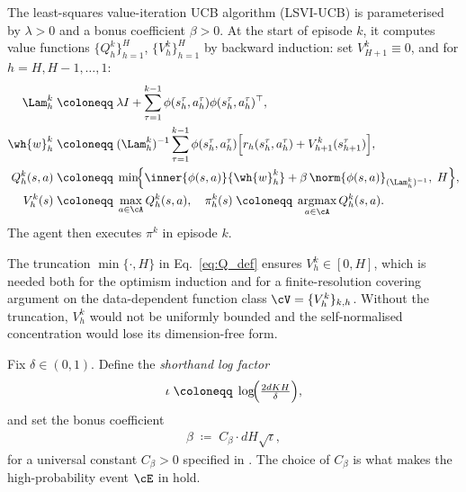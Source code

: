 \begin{definition}\label{def:lsvi_ucb}
The least-squares value-iteration UCB algorithm (LSVI-UCB) is parameterised by $\lambda > 0$ and a bonus coefficient $\beta > 0$. At the start of episode $k$, it computes value functions $\{Q_h^k\}_{h=1}^H$, $\{V_h^k\}_{h=1}^H$ by backward induction: set $V_{H+1}^k \equiv 0$, and for $h = H, H{-}1, \ldots, 1$:
\begin{align}
\Lam_h^k
&\;\coloneqq\; \lambda I + \sum_{\tau=1}^{k-1} \phi(s_h^\tau, a_h^\tau) \phi(s_h^\tau, a_h^\tau)^\top, \label{eq:Lambda_def}\\
\wh{w}_h^k
&\;\coloneqq\; (\Lam_h^k)^{-1} \sum_{\tau=1}^{k-1} \phi(s_h^\tau, a_h^\tau)\Bigl[ r_h(s_h^\tau, a_h^\tau) + V_{h+1}^k(s_{h+1}^\tau) \Bigr], \label{eq:w_hat_def} \\
Q_h^k(s, a)
&\;\coloneqq\; \min\!\Bigl\{ \inner{\phi(s, a)}{\wh{w}_h^k} + \beta\, \norm{\phi(s, a)}_{(\Lam_h^k)^{-1}},\; H \Bigr\}, \label{eq:Q_def}\\
V_h^k(s)
&\;\coloneqq\; \max_{a \in \cA} Q_h^k(s, a),
\quad \pi_h^k(s) \;\coloneqq\; \mathop{\mathrm{argmax}}_{a \in \cA} Q_h^k(s, a). \label{eq:V_def}
\end{align}
The agent then executes $\pi^k$ in episode $k$.
\end{definition}

\begin{remark}\label{rem:V_func_class}
The truncation $\min\{\cdot, H\}$ in Eq.~\eqref{eq:Q_def} ensures $V_h^k \in [0, H]$, which is needed both for the optimism induction and for a finite-resolution covering argument on the data-dependent function class $\cV = \{V_h^k\}_{k,h}$. Without the truncation, $V_h^k$ would not be uniformly bounded and the self-normalised concentration would lose its dimension-free form.
\end{remark}

\begin{definition}\label{def:beta}
Fix $\delta \in (0, 1)$. Define the \emph{shorthand log factor}
\begin{align}\label{eq:iota_def}
\iota \;\coloneqq\; \log\!\Bigl( \tfrac{2 d K H}{\delta} \Bigr),
\end{align}
and set the bonus coefficient
\begin{align}\label{eq:beta_def}
\beta \;\coloneqq\; C_\beta \cdot d H \sqrt{\iota},
\end{align}
for a universal constant $C_\beta > 0$ specified in . The choice of $C_\beta$ is what makes the high-probability event $\cE$ in  hold.
\end{definition}

